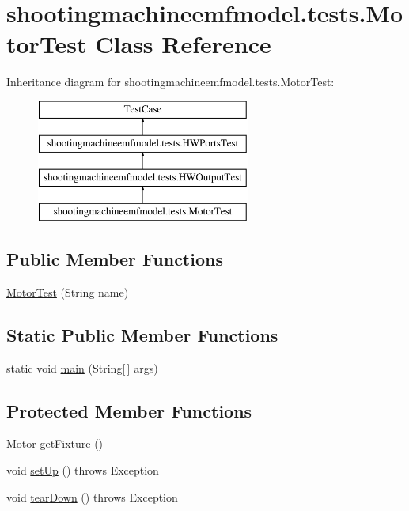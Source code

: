 \hypertarget{classshootingmachineemfmodel_1_1tests_1_1_motor_test}{\section{shootingmachineemfmodel.\-tests.\-Motor\-Test Class Reference}
\label{classshootingmachineemfmodel_1_1tests_1_1_motor_test}
}
Inheritance diagram for shootingmachineemfmodel.\-tests.\-Motor\-Test\-:\begin{figure}[H]
\begin{center}
\leavevmode
\includegraphics[height=4.000000cm]{classshootingmachineemfmodel_1_1tests_1_1_motor_test}
\end{center}
\end{figure}
\subsection*{Public Member Functions}
\begin{DoxyCompactItemize}
\item 
\hyperlink{classshootingmachineemfmodel_1_1tests_1_1_motor_test_a7d9cc9f39da0739a84cedc2a82d95a1c}{Motor\-Test} (String name)
\end{DoxyCompactItemize}
\subsection*{Static Public Member Functions}
\begin{DoxyCompactItemize}
\item 
static void \hyperlink{classshootingmachineemfmodel_1_1tests_1_1_motor_test_a01aeb931d37d529958d822dac80817d9}{main} (String\mbox{[}$\,$\mbox{]} args)
\end{DoxyCompactItemize}
\subsection*{Protected Member Functions}
\begin{DoxyCompactItemize}
\item 
\hyperlink{interfaceshootingmachineemfmodel_1_1_motor}{Motor} \hyperlink{classshootingmachineemfmodel_1_1tests_1_1_motor_test_a268e8fe248737106aa470f2cf7f3c119}{get\-Fixture} ()
\item 
void \hyperlink{classshootingmachineemfmodel_1_1tests_1_1_motor_test_a44f5374a823109346bd63b63ed37c7b7}{set\-Up} ()  throws Exception 
\item 
void \hyperlink{classshootingmachineemfmodel_1_1tests_1_1_motor_test_a02a7629348e574e5e5cad933432cd630}{tear\-Down} ()  throws Exception 
\end{DoxyCompactItemize}
